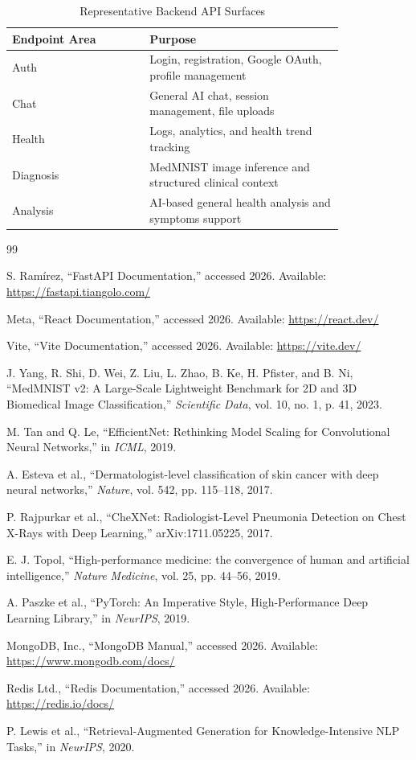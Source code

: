 \documentclass[conference]{IEEEtran}
\begin{document}
\begin{table}[H]
\centering
\caption{Representative Backend API Surfaces}
\label{tab:api}
\begin{tabular}{p{0.34\linewidth} p{0.48\linewidth}}
\toprule
\textbf{Endpoint Area} & \textbf{Purpose} \\
\midrule
Auth & Login, registration, Google OAuth, profile management \\
Chat & General AI chat, session management, file uploads \\
Health & Logs, analytics, and health trend tracking \\
Diagnosis & MedMNIST image inference and structured clinical context \\
Analysis & AI-based general health analysis and symptoms support \\
\bottomrule
\end{tabular}
\end{table}

\begin{thebibliography}{99}

S. Ramírez, ``FastAPI Documentation,'' accessed 2026. Available: \url{https://fastapi.tiangolo.com/}

Meta, ``React Documentation,'' accessed 2026. Available: \url{https://react.dev/}

Vite, ``Vite Documentation,'' accessed 2026. Available: \url{https://vite.dev/}

J. Yang, R. Shi, D. Wei, Z. Liu, L. Zhao, B. Ke, H. Pfister, and B. Ni, ``MedMNIST v2: A Large-Scale Lightweight Benchmark for 2D and 3D Biomedical Image Classification,'' \emph{Scientific Data}, vol. 10, no. 1, p. 41, 2023.

M. Tan and Q. Le, ``EfficientNet: Rethinking Model Scaling for Convolutional Neural Networks,'' in \emph{ICML}, 2019.

A. Esteva et al., ``Dermatologist-level classification of skin cancer with deep neural networks,'' \emph{Nature}, vol. 542, pp. 115--118, 2017.

P. Rajpurkar et al., ``CheXNet: Radiologist-Level Pneumonia Detection on Chest X-Rays with Deep Learning,'' arXiv:1711.05225, 2017.

E. J. Topol, ``High-performance medicine: the convergence of human and artificial intelligence,'' \emph{Nature Medicine}, vol. 25, pp. 44--56, 2019.

A. Paszke et al., ``PyTorch: An Imperative Style, High-Performance Deep Learning Library,'' in \emph{NeurIPS}, 2019.

MongoDB, Inc., ``MongoDB Manual,'' accessed 2026. Available: \url{https://www.mongodb.com/docs/}

Redis Ltd., ``Redis Documentation,'' accessed 2026. Available: \url{https://redis.io/docs/}

P. Lewis et al., ``Retrieval-Augmented Generation for Knowledge-Intensive NLP Tasks,'' in \emph{NeurIPS}, 2020.

\end{thebibliography}
\end{document}
